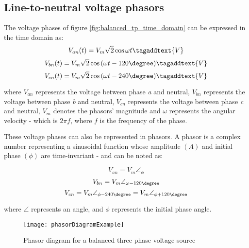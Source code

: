 \subsection{Line-to-neutral voltage phasors}

The voltage phases of figure \ref{fig:balanced_tp_time_domain} can be expressed in the time domain as:
\begin{equation} \label{eq:balanced_tpVan_timedomain}
	V_{an}(t) = V_{m}\sqrt{2}\cos{\omega t}
	\tagaddtext{V}
\end{equation}
\begin{equation} \label{eq:balanced_tpVbn_timedomain}
	V_{bn}(t) = V_{m}\sqrt{2}\cos{\left(\omega t - 120\degree\right)} 
	\tagaddtext{V}
\end{equation}
\begin{equation} \label{eq:balanced_tpVcn_timedomain}
	V_{cn}(t) = V_{m}\sqrt{2}\cos{\left(\omega t - 240\degree\right)} 
	\tagaddtext{V}
\end{equation}

where $V_{an}$ represents the voltage between phase \emph{a} and neutral, $V_{bn}$ represents the voltage between phase \emph{b} and neutral, $V_{cn}$ represents the voltage between phase \emph{c} and neutral, $V_{m}$ denotes the phasors' magnitude and $\omega$ represents the angular velocity - which is $2\pi f$, where $f$ is the frequency of the phase. 

These voltage phases can also be represented in phasors. A phasor is a complex number representing a sinusoidal function whose amplitude $(A)$ and initial phase $(\phi)$ are time-invariant - and can be noted as:

\begin{equation} \label{eq:balanced_tpVan}
	V_{an} = V_{m}\angle_{\phi}
\end{equation}
\begin{equation} \label{eq:balanced_tpVbn}
	V_{bn} = V_{m}\angle_{\omega - 120\degree} 
\end{equation}
\begin{equation} \label{eq:balanced_tpVcn}
	V_{cn} = V_{m}\angle_{\phi - 240\degree} = V_{m}\angle_{\phi + 120\degree} 
\end{equation}

\noindent where $\angle$ represents an angle, and $\phi$ represents the initial phase angle.

\begin{figure}[htbp]
	\centering
	\texttt{[image: phasorDiagramExample]}
	\caption{Phasor diagram for a balanced three phase voltage source}
	\label{fig:balanced_tp_phasor_domain}
\end{figure}

